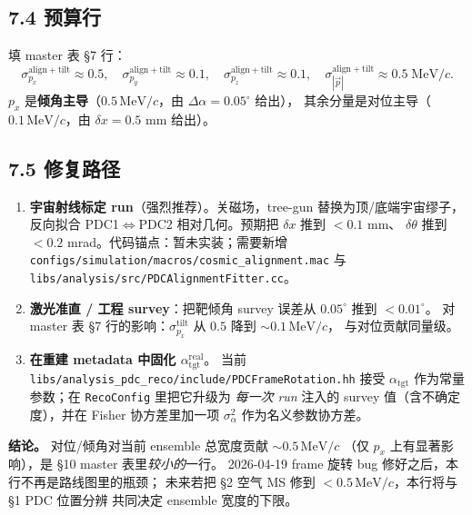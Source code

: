 \subsection*{7.4 预算行}

填 master 表 §7 行：
\begin{equation}
  \sigma_{p_x}^\mathrm{align+tilt} \approx 0.5,\quad
  \sigma_{p_y}^\mathrm{align+tilt} \approx 0.1,\quad
  \sigma_{p_z}^\mathrm{align+tilt} \approx 0.1,\quad
  \sigma_{|\vec p|}^\mathrm{align+tilt} \approx 0.5\;\mathrm{MeV}/c.
  \label{eq:partIIc:budget:row7}
\end{equation}
$p_x$ 是\textbf{倾角主导}（$0.5\,\mathrm{MeV}/c$，由 $\Delta\alpha=0.05^\circ$ 给出），
其余分量是对位主导（$0.1\,\mathrm{MeV}/c$，由 $\delta x=0.5$ mm 给出）。

\subsection*{7.5 修复路径}

\begin{enumerate}
  \item \textbf{宇宙射线标定 run}（强烈推荐）。关磁场，tree-gun 替换为顶/底端宇宙缪子，
        反向拟合 PDC1$\Leftrightarrow$PDC2 相对几何。预期把 $\delta x$ 推到 $<0.1$ mm、
        $\delta\theta$ 推到 $<0.2$ mrad。代码锚点：暂未实装；需要新增
        \texttt{configs/simulation/macros/cosmic\_alignment.mac} 与
        \texttt{libs/analysis/src/PDCAlignmentFitter.cc}。
  \item \textbf{激光准直 / 工程 survey}：把靶倾角 survey 误差从 $0.05^\circ$ 推到 $<0.01^\circ$。
        对 master 表 §7 行的影响：$\sigma_{p_x}^\mathrm{tilt}$ 从 $0.5$ 降到 $\sim 0.1\,\mathrm{MeV}/c$，
        与对位贡献同量级。
  \item \textbf{在重建 metadata 中固化 $\alpha_\mathrm{tgt}^\mathrm{real}$}。
        当前 \texttt{libs/analysis\_pdc\_reco/include/PDCFrameRotation.hh} 接受
        $\alpha_\mathrm{tgt}$ 作为常量参数；在 \texttt{RecoConfig} 里把它升级为
        \emph{每一次 run} 注入的 survey 值（含不确定度），并在 Fisher 协方差里加一项
        $\sigma_\alpha^2$ 作为名义参数协方差。
\end{enumerate}

\textbf{结论。} 对位/倾角对当前 ensemble 总宽度贡献 $\sim 0.5\,\mathrm{MeV}/c$
（仅 $p_x$ 上有显著影响），是 §10 master 表里\emph{较小的}一行。
2026-04-19 frame 旋转 bug 修好之后，本行不再是路线图里的瓶颈；
未来若把 §2 空气 MS 修到 $<0.5\,\mathrm{MeV}/c$，本行将与 §1 PDC 位置分辨
共同决定 ensemble 宽度的下限。

